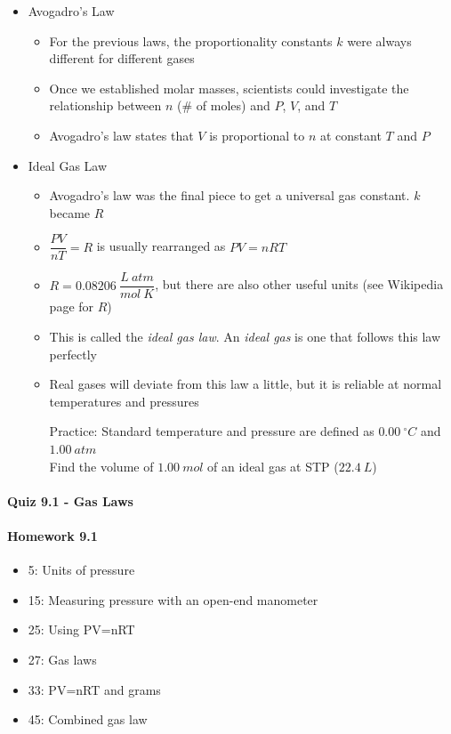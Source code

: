 \documentclass[12pt, openany, letterpaper]{memoir}
\begin{document}
\begin{itemize}
\begin{itemize}
            Practice: A balloon with $V=1.25~L$ at $P=0.850~atm$ and $T=284~k$ is released into the atmosphere where $P=0.430~atm$ and $T=243~K$. What is the new volume? ($2.11~L$)
    \end{itemize}
  \item{Avogadro's Law}
    \begin{itemize}
      \item For the previous laws, the proportionality constants $k$ were always different for different gases
      \item Once we established molar masses, scientists could investigate the relationship between $n$ (\# of moles) and $P$, $V$, and $T$
      \item Avogadro's law states that $V$ is proportional to $n$ at constant $T$ and $P$
    \end{itemize}
  \item Ideal Gas Law
    \begin{itemize}
      \item Avogadro's law was the final piece to get a universal gas constant. $k$ became $R$
      \item $\dfrac{PV}{nT}=R$ is usually rearranged as $PV=nRT$
      \item $R=0.08206~\dfrac{L~atm}{mol~K}$, but there are also other useful units (see Wikipedia page for $R$)
      \item This is called the \emph{ideal gas law}. An \emph{ideal gas} is one that follows this law perfectly
      \item Real gases will deviate from this law a little, but it is reliable at normal temperatures and pressures

            Practice: Standard temperature and pressure are defined as $0.00~^\circ C$ and $1.00~atm$\\
            Find the volume of $1.00~mol$ of an ideal gas at STP ($22.4~L$)
    \end{itemize}
\end{itemize}

\paragraph*{Quiz 9.1 - Gas Laws}
\paragraph*{Homework 9.1}
\begin{itemize}
  \item 5: Units of pressure
  \item 15: Measuring pressure with an open-end manometer
  \item 25: Using PV=nRT
  \item 27: Gas laws
  \item 33: PV=nRT and grams
  \item 45: Combined gas law
\end{itemize}
\end{document}
